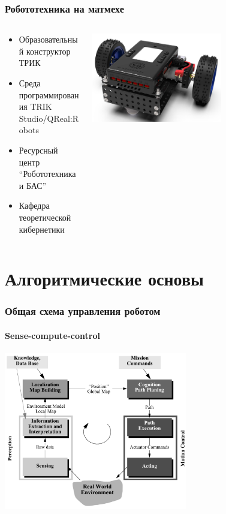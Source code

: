 \documentclass{../../slides-style}
\begin{document}
    \begin{frame}
        \frametitle{Робототехника на матмехе}
        \begin{columns}
            \begin{column}{0.5\textwidth}
                \begin{itemize}
                    \item Образовательный конструктор ТРИК
                    \item Среда программирования TRIK Studio/QReal:Robots
                    \item Ресурсный центр \enquote{Робототехника и БАС}
                    \item Кафедра теоретической кибернетики
                \end{itemize}
            \end{column}
            \begin{column}{0.5\textwidth}
                \begin{center}
                    \includegraphics[width=0.6\textwidth]{trik.png}
                \end{center}
            \end{column}
        \end{columns}
    \end{frame}

    \section{Алгоритмические основы}

    \begin{frame}
        \frametitle{Общая схема управления роботом}
        \framesubtitle{Sense-compute-control}
        \begin{center}
            \includegraphics[width=0.6\textwidth]{controlLoop.png}
        \end{center}
    \end{frame}
\end{document}
